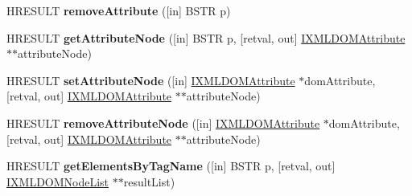 \begin{DoxyCompactItemize}
\item 
\mbox{\label{interface_m_s_x_m_l2_1_1_i_x_m_l_d_o_m_element_ab235c8d8a0ceeae7785d25eb34896b5c}} 
H\+R\+E\+S\+U\+LT {\bfseries remove\+Attribute} (\mbox{[}in\mbox{]} B\+S\+TR p)
\item 
\mbox{\label{interface_m_s_x_m_l2_1_1_i_x_m_l_d_o_m_element_a6654967474f2f49af78325989cabb8f6}} 
H\+R\+E\+S\+U\+LT {\bfseries get\+Attribute\+Node} (\mbox{[}in\mbox{]} B\+S\+TR p, \mbox{[}retval, out\mbox{]} \hyperlink{interface_m_s_x_m_l2_1_1_i_x_m_l_d_o_m_attribute}{I\+X\+M\+L\+D\+O\+M\+Attribute} $\ast$$\ast$attribute\+Node)
\item 
\mbox{\label{interface_m_s_x_m_l2_1_1_i_x_m_l_d_o_m_element_aaaf8e1556fbaafd93fdf02c51c0fea9a}} 
H\+R\+E\+S\+U\+LT {\bfseries set\+Attribute\+Node} (\mbox{[}in\mbox{]} \hyperlink{interface_m_s_x_m_l2_1_1_i_x_m_l_d_o_m_attribute}{I\+X\+M\+L\+D\+O\+M\+Attribute} $\ast$dom\+Attribute, \mbox{[}retval, out\mbox{]} \hyperlink{interface_m_s_x_m_l2_1_1_i_x_m_l_d_o_m_attribute}{I\+X\+M\+L\+D\+O\+M\+Attribute} $\ast$$\ast$attribute\+Node)
\item 
\mbox{\label{interface_m_s_x_m_l2_1_1_i_x_m_l_d_o_m_element_a9c92f88f61011fb9e5811f0e1bf07ff9}} 
H\+R\+E\+S\+U\+LT {\bfseries remove\+Attribute\+Node} (\mbox{[}in\mbox{]} \hyperlink{interface_m_s_x_m_l2_1_1_i_x_m_l_d_o_m_attribute}{I\+X\+M\+L\+D\+O\+M\+Attribute} $\ast$dom\+Attribute, \mbox{[}retval, out\mbox{]} \hyperlink{interface_m_s_x_m_l2_1_1_i_x_m_l_d_o_m_attribute}{I\+X\+M\+L\+D\+O\+M\+Attribute} $\ast$$\ast$attribute\+Node)
\item 
\mbox{\label{interface_m_s_x_m_l2_1_1_i_x_m_l_d_o_m_element_a155c1b6fd760a0e1441932dda5b13c9c}} 
H\+R\+E\+S\+U\+LT {\bfseries get\+Elements\+By\+Tag\+Name} (\mbox{[}in\mbox{]} B\+S\+TR p, \mbox{[}retval, out\mbox{]} \hyperlink{interface_m_s_x_m_l2_1_1_i_x_m_l_d_o_m_node_list}{I\+X\+M\+L\+D\+O\+M\+Node\+List} $\ast$$\ast$result\+List)
\item 
\mbox{\label{interface_m_s_x_m_l2_1_1_i_x_m_l_d_o_m_element_abaa048d73e3b2e6bfa203780b5faf3e6}} 

\end{DoxyCompactItemize}
